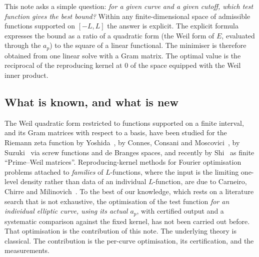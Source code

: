 \documentclass[11pt]{amsart}
\theoremstyle{remark}
\theoremstyle{definition}
\begin{document}
This note asks a simple question: \emph{for a given curve and a given cutoff, which test function gives the best bound?} Within any finite-dimensional space of admissible functions supported on $[-L,L]$ the answer is explicit. The explicit formula expresses the bound as a ratio of a quadratic form (the Weil form of $E$, evaluated through the $a_p$) to the square of a linear functional. The minimiser is therefore obtained from one linear solve with a Gram matrix. The optimal value is the reciprocal of the reproducing kernel at $0$ of the space equipped with the Weil inner product.

\subsection*{What is known, and what is new}
The Weil quadratic form restricted to functions supported on a finite interval, and its Gram matrices with respect to a basis, have been studied for the Riemann zeta function by Yoshida~\cite{Yoshida}, by Connes, Consani and Moscovici~\cite{CCM}, by Suzuki~\cite{Suzuki} via screw functions and de Branges spaces, and recently by Shi~\cite{Shi} as finite ``Prime--Weil matrices''. Reproducing-kernel methods for Fourier optimisation problems attached to \emph{families} of $L$-functions, where the input is the limiting one-level density rather than data of an individual $L$-function, are due to Carneiro, Chirre and Milinovich~\cite{CCMil}. To the best of our knowledge, which rests on a literature search that is not exhaustive, the optimisation of the test function \emph{for an individual elliptic curve, using its actual $a_p$}, with certified output and a systematic comparison against the fixed kernel, has not been carried out before. That optimisation is the contribution of this note. The underlying theory is classical. The contribution is the per-curve optimisation, its certification, and the measurements.
\end{document}
